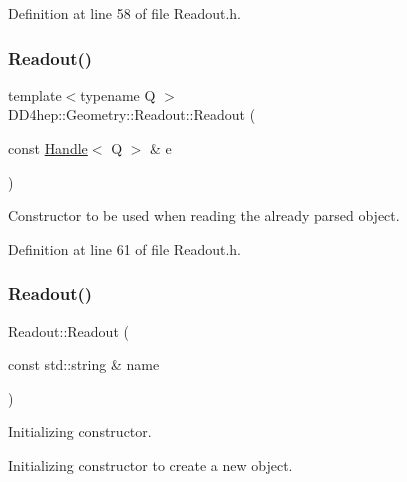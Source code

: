 Definition at line 58 of file Readout.\+h.

\hypertarget{class_d_d4hep_1_1_geometry_1_1_readout_a604b89528c99c775beb5931470280c30}{}\label{class_d_d4hep_1_1_geometry_1_1_readout_a604b89528c99c775beb5931470280c30} 
\subsubsection{\texorpdfstring{Readout()}{Readout()}\hspace{0.1cm}{\footnotesize\ttfamily [4/5]}}
{\footnotesize\ttfamily template$<$typename Q $>$ \\
D\+D4hep\+::\+Geometry\+::\+Readout\+::\+Readout (\begin{DoxyParamCaption}\item[{const \hyperlink{class_d_d4hep_1_1_handle}{Handle}$<$ Q $>$ \&}]{e }\end{DoxyParamCaption})\hspace{0.3cm}{\ttfamily [inline]}}



Constructor to be used when reading the already parsed object. 



Definition at line 61 of file Readout.\+h.

\hypertarget{class_d_d4hep_1_1_geometry_1_1_readout_af244b9f3e7ac53e9a69495cabc7eea31}{}\label{class_d_d4hep_1_1_geometry_1_1_readout_af244b9f3e7ac53e9a69495cabc7eea31} 
\subsubsection{\texorpdfstring{Readout()}{Readout()}\hspace{0.1cm}{\footnotesize\ttfamily [5/5]}}
{\footnotesize\ttfamily Readout\+::\+Readout (\begin{DoxyParamCaption}\item[{const std\+::string \&}]{name }\end{DoxyParamCaption})}



Initializing constructor. 

Initializing constructor to create a new object. 

